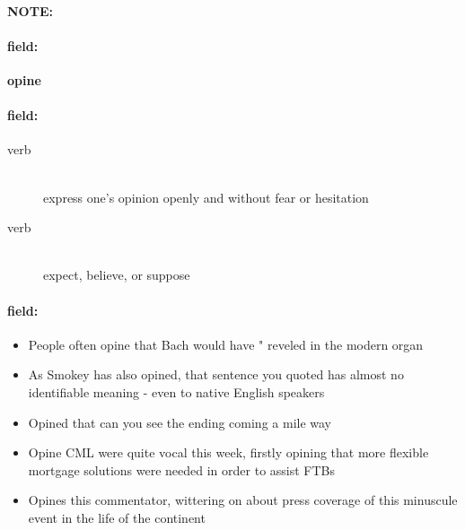 \documentclass[12pt]{article}
\newenvironment{note}{\paragraph{NOTE:}}{}
\newenvironment{field}{\paragraph{field:}}{}
\begin{document}
\begin{note}
\begin{field}
\textbf{\large opine}
\end{field}


\begin{field}
\begin{description}
\item[verb] \hfill \\ 
express one's opinion openly and without fear or hesitation

\item[verb] \hfill \\ 
expect, believe, or suppose

\end{description}
\end{field}

\begin{field}
\begin{itemize}
\item People often opine that Bach would have " reveled in the modern organ
\item As Smokey has also opined, that sentence you quoted has almost no identifiable meaning - even to native English speakers
\item Opined that can you see the ending coming a mile way
\item Opine CML were quite vocal this week, firstly opining that more flexible mortgage solutions were needed in order to assist FTBs
\item Opines this commentator, wittering on about press coverage of this minuscule event in the life of the continent
\end{itemize}
\end{field}
\end{note}
\end{document}
